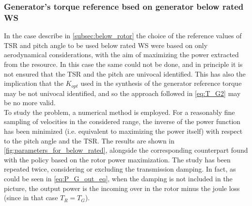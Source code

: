\subsubsection[Below rated WS]{Generator's torque reference bsed on generator below rated WS}
In the case describe in \autoref{subsec:below_rotor} the choice of the reference values of TSR and pitch angle to be used below rated WS were based on only aerodynamical considerations, with the aim of maximizing the power extracted from the resource. In this case the same could not be done, and in principle it is not ensured that the TSR and the pitch are univocal identified. This has also the implication that the $K_{opt}$ used in the synthesis of the generator reference torque may be not univocal identified, and so the approach followed in \autoref{eq:T_G2} may be no more valid. \\
To study the problem, a numerical method is employed. For a reasonably fine sampling of velocities in the considered range, the inverse of the power function has been minimized (i.e. equivalent to maximizing the power itself) with respect to the pitch angle and the TSR. The results are shown in \autoref{fig:parameters_for_below_rated}, alongside the corresponding counterpart found with the policy based on the rotor power maximization. The study has been repeated twice, considering or excluding the transmission damping. In fact, as could be seen in \autoref{eq:P_G_out_eq}, when the damping is not included in the picture, the output power is the incoming over in the rotor minus the joule loss (since in that case $T_R=T_G$).

